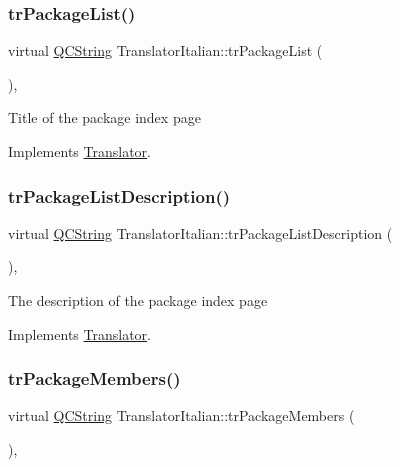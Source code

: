 \subsubsection{\texorpdfstring{trPackageList()}{trPackageList()}}
{\footnotesize\ttfamily virtual \mbox{\hyperlink{class_q_c_string}{Q\+C\+String}} Translator\+Italian\+::tr\+Package\+List (\begin{DoxyParamCaption}{ }\end{DoxyParamCaption})\hspace{0.3cm}{\ttfamily [inline]}, {\ttfamily [virtual]}}

Title of the package index page 

Implements \mbox{\hyperlink{class_translator}{Translator}}.

\mbox{\label{class_translator_italian_a502041bed3574cd6ad63a0288974d991}} 
\subsubsection{\texorpdfstring{trPackageListDescription()}{trPackageListDescription()}}
{\footnotesize\ttfamily virtual \mbox{\hyperlink{class_q_c_string}{Q\+C\+String}} Translator\+Italian\+::tr\+Package\+List\+Description (\begin{DoxyParamCaption}{ }\end{DoxyParamCaption})\hspace{0.3cm}{\ttfamily [inline]}, {\ttfamily [virtual]}}

The description of the package index page 

Implements \mbox{\hyperlink{class_translator}{Translator}}.

\mbox{\label{class_translator_italian_a69898e659d6832ecf26184e01bd68aa9}} 
\subsubsection{\texorpdfstring{trPackageMembers()}{trPackageMembers()}}
{\footnotesize\ttfamily virtual \mbox{\hyperlink{class_q_c_string}{Q\+C\+String}} Translator\+Italian\+::tr\+Package\+Members (\begin{DoxyParamCaption}{ }\end{DoxyParamCaption})\hspace{0.3cm}{\ttfamily [inline]}, {\ttfamily [virtual]}}

